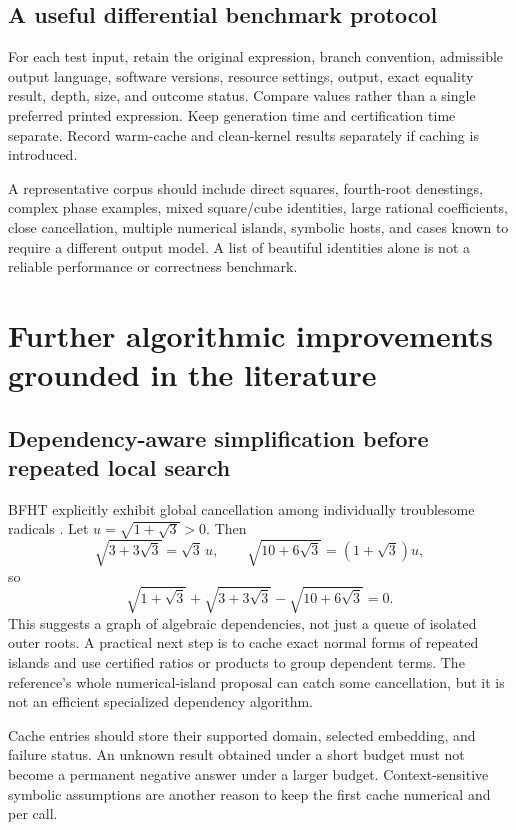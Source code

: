 \documentclass[11pt,letterpaper]{article}
\numberwithin{equation}{section}
\theoremstyle{definition}\newtheorem{definition}[theorem]{Definition}
\theoremstyle{remark}\newtheorem{remark}[theorem]{Remark}
\newcommand{\code}[1]{\texttt{\detokenize{#1}}}
\begin{document}
\subsection{A useful differential benchmark protocol}
For each test input, retain the original expression, branch convention, admissible output language, software versions, resource settings, output, exact equality result, depth, size, and outcome status. Compare values rather than a single preferred printed expression. Keep generation time and certification time separate. Record warm-cache and clean-kernel results separately if caching is introduced.

A representative corpus should include direct squares, fourth-root denestings, complex phase examples, mixed square/cube identities, large rational coefficients, close cancellation, multiple numerical islands, symbolic hosts, and cases known to require a different output model. A list of beautiful identities alone is not a reliable performance or correctness benchmark.

\section{Further algorithmic improvements grounded in the literature}
\label{sec:future}

\subsection{Dependency-aware simplification before repeated local search}
BFHT explicitly exhibit global cancellation among individually troublesome radicals \cite{bfht}. Let $u=\sqrt{1+\sqrt3}>0$. Then
\[
 \sqrt{3+3\sqrt3}=\sqrt3\,u,
 \qquad \sqrt{10+6\sqrt3}=(1+\sqrt3)u,
\]
so
\[
 \sqrt{1+\sqrt3}+\sqrt{3+3\sqrt3}-\sqrt{10+6\sqrt3}=0.
\]
This suggests a graph of algebraic dependencies, not just a queue of isolated outer roots. A practical next step is to cache exact normal forms of repeated islands and use certified ratios or products to group dependent terms. The reference's whole numerical-island \code{RootReduce} proposal can catch some cancellation, but it is not an efficient specialized dependency algorithm.

Cache entries should store their supported domain, selected embedding, and failure status. An unknown result obtained under a short budget must not become a permanent negative answer under a larger budget. Context-sensitive symbolic assumptions are another reason to keep the first cache numerical and per call.
\end{document}
